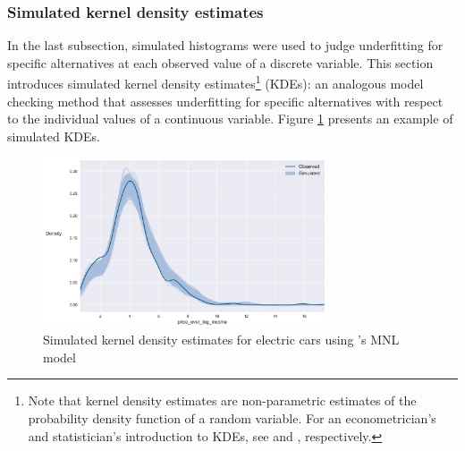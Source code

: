 \documentclass[preprint]{elsarticle}
\begin{document}
\subsubsection{Simulated kernel density estimates}
\label{sec:case1-part1-kdes}
In the last subsection, simulated histograms were used to judge underfitting for specific alternatives at each observed value of a discrete variable. This section introduces simulated kernel density estimates\footnote{Note that kernel density estimates are non-parametric estimates of the probability density function of a random variable. For an econometrician's and statistician's introduction to KDEs, see \citet{racine_nonparametric_2008} and \citet{wasserman_all_2006}, respectively.} (KDEs): an analogous model checking method that assesses underfitting for specific alternatives with respect to the individual values of a continuous variable. Figure \ref{fig:orig-mnl-electric-kde} presents an example of simulated KDEs. 

\begin{figure}
\centering
\includegraphics[width=0.75\textwidth]{kde-vehicle-choice-mnl-electric-price}
\caption{Simulated kernel density estimates for electric cars using \citeauthor{brownstone_forecasting_1998}'s MNL model}
\label{fig:orig-mnl-electric-kde}
\end{figure}
\end{document}
